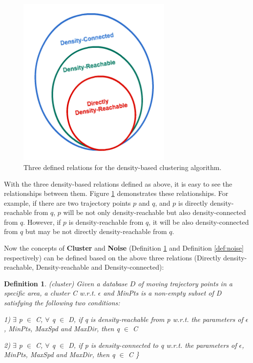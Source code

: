 \documentclass[12pt,glossary]{dalcsthesis}
\newtheorem{definition}{Definition}
\begin{document}
\begin{figure}[!htb]
\centering
\includegraphics[width=3in]{relations.png}%
\caption{Three defined relations for the density-based clustering algorithm.}
\label{fig:relations}
\end{figure}


With the three density-based relations defined as above, it is easy to see the relationships between them. Figure \ref{fig:relations} demonstrates these relationships. For example, if there are two trajectory points $p$ and $q$, and $p$ is directly density-reachable from $q$, $p$ will be not only density-reachable but also density-connected from $q$. However, if $p$ is density-reachable from $q$, it will be also density-connected from $q$ but may be not directly density-reachable from $q$. 


Now the concepts of \textbf{Cluster} and \textbf{Noise} (Definition \ref{def:cluster} and Definition \ref{def:noise} respectively) can be defined based on the above three relations (Directly density-reachable, Density-reachable and Density-connected):

\begin{definition}
\label{def:cluster}
(cluster)
Given a database $D$ of moving trajectory points in a specific area, a cluster C w.r.t. $\epsilon$ and MinPts is a non-empty subset of D satisfying the following two conditions:

1) $\exists$ p $\in$ C, $\forall$ q $\in$ D, if q is density-reachable from p w.r.t. the parameters of $\epsilon$, MinPts, MaxSpd and MaxDir, then q $\in$ C

2) $\exists$ p $\in$ C, $\forall$ q $\in$ D, if p is density-connected to q w.r.t. the parameters of $\epsilon$, MinPts, MaxSpd and MaxDir, then q $\in$ C
\}
\end{definition}
\end{document}
